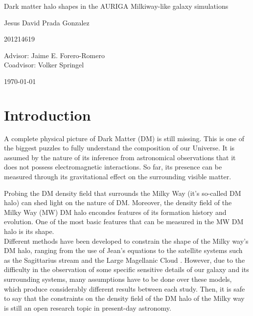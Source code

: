 \documentclass[12pt]{article}
\begin{document}
\begin{center}
\Huge
Dark matter halo shapes in the AURIGA Milkiway-like galaxy simulations

\vspace{3mm}
\Large Jesus David Prada Gonzalez

\large
201214619


\vspace{2mm}
\Large
Advisor: Jaime E. Forero-Romero\\
Coadvisor: Volker Springel
\normalsize
\vspace{2mm}

\today
\end{center}


\normalsize
\section{Introduction}


A complete physical picture of Dark Matter (DM) is still missing.
This is one of the biggest puzzles to fully understand the composition of our Universe.
It is assumed by the nature of its inference from astronomical observations that it does not possess electromagnetic interactions.
So far, its presence can be measured through its gravitational effect on the surrounding visible matter. 

Probing the DM density field that surrounds the Milky Way (it's so-called DM halo) can shed light on the nature of DM. 
Moreover, the density field of the Milky Way (MW) DM halo encondes features of its formation history and evolution.
One of the most basic features that can be measured in the MW DM halo is its shape. \\

Different methods have been developed to constrain the shape of the Milky way's DM halo, ranging from the use of Jean's equations \cite{Loebman et al. 2012} to the satellite systems such as the Sagittarius stream and the Large Magellanic Cloud \cite{Vera-Ciro et al 2013, Deg & Widrow 2012, Law & Majewski 2010}. However, due to the difficulty in the observation of some specific sensitive details of our galaxy and its surrounding systems, many assumptions have to be done over these models, which produce considerably different results between each study. Then, it is safe to say that the constraints on the density field of the DM halo of the Milky way is still an open research topic in present-day astronomy. \\
\end{document}
